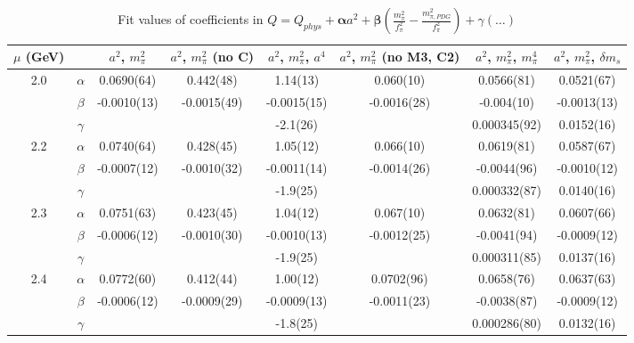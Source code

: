 \documentclass[12pt]{extarticle}
\begin{document}
\begin{table}[h!]
\begin{center}
\begin{tabular}{|c c|c|c|c|c|c|c|}
\hline
$\mu$ (GeV) &  & $a^2$, $m_\pi^2$& $a^2$, $m_\pi^2$ (no C)& $a^2$, $m_\pi^2$, $a^4$& $a^2$, $m_\pi^2$ (no M3, C2)& $a^2$, $m_\pi^2$, $m_\pi^4$& $a^2$, $m_\pi^2$, $\delta m_s$\\
\hline
\multirow{3}{0.5in}{2.0} & $\alpha$ & 0.0690(64)& 0.442(48)& 1.14(13)& 0.060(10)& 0.0566(81)& 0.0521(67)\\
 & $\beta$ & -0.0010(13)& -0.0015(49)& -0.0015(15)& -0.0016(28)& -0.004(10)& -0.0013(13)\\
 & $\gamma$ &  &  & -2.1(26)&  & 0.000345(92)& 0.0152(16)\\
\hline
\multirow{3}{0.5in}{2.2} & $\alpha$ & 0.0740(64)& 0.428(45)& 1.05(12)& 0.066(10)& 0.0619(81)& 0.0587(67)\\
 & $\beta$ & -0.0007(12)& -0.0010(32)& -0.0011(14)& -0.0014(26)& -0.0044(96)& -0.0010(12)\\
 & $\gamma$ &  &  & -1.9(25)&  & 0.000332(87)& 0.0140(16)\\
\hline
\multirow{3}{0.5in}{2.3} & $\alpha$ & 0.0751(63)& 0.423(45)& 1.04(12)& 0.067(10)& 0.0632(81)& 0.0607(66)\\
 & $\beta$ & -0.0006(12)& -0.0010(30)& -0.0010(13)& -0.0012(25)& -0.0041(94)& -0.0009(12)\\
 & $\gamma$ &  &  & -1.9(25)&  & 0.000311(85)& 0.0137(16)\\
\hline
\multirow{3}{0.5in}{2.4} & $\alpha$ & 0.0772(60)& 0.412(44)& 1.00(12)& 0.0702(96)& 0.0658(76)& 0.0637(63)\\
 & $\beta$ & -0.0006(12)& -0.0009(29)& -0.0009(13)& -0.0011(23)& -0.0038(87)& -0.0009(12)\\
 & $\gamma$ &  &  & -1.8(25)&  & 0.000286(80)& 0.0132(16)\\
\hline
\end{tabular}
\caption{Fit values of coefficients in $Q = Q_{phys} + \mathbf{\alpha} a^2 + \mathbf{\beta}\left(\frac{m_\pi^2}{f_\pi^2}-\frac{m_{\pi,PDG}^2}{f_\pi^2}\right) + \gamma(\ldots)$}
\end{center}
\end{table}






\end{document}
